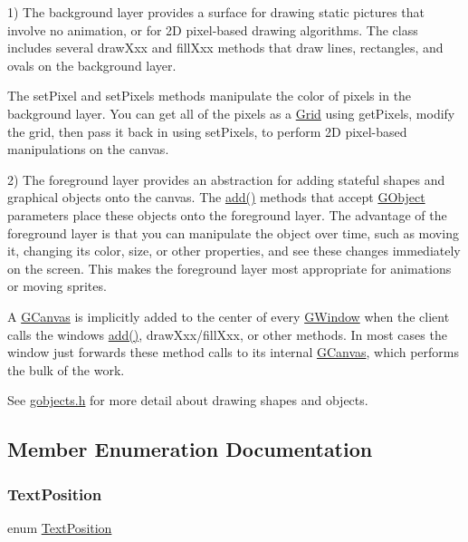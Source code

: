 1) The background layer provides a surface for drawing static pictures that involve no animation, or for 2D pixel-\/based drawing algorithms. The class includes several draw\+Xxx and fill\+Xxx methods that draw lines, rectangles, and ovals on the background layer.

The set\+Pixel and set\+Pixels methods manipulate the color of pixels in the background layer. You can get all of the pixels as a \mbox{\hyperlink{classGrid}{Grid}} using get\+Pixels, modify the grid, then pass it back in using set\+Pixels, to perform 2D pixel-\/based manipulations on the canvas.

2) The foreground layer provides an abstraction for adding stateful shapes and graphical objects onto the canvas. The \mbox{\hyperlink{classGCanvas_afe8277e7b2627513c6f7452fb0b2847d}{add()}} methods that accept \mbox{\hyperlink{classGObject}{G\+Object}} parameters place these objects onto the foreground layer. The advantage of the foreground layer is that you can manipulate the object over time, such as moving it, changing its color, size, or other properties, and see these changes immediately on the screen. This makes the foreground layer most appropriate for animations or moving sprites.

A \mbox{\hyperlink{classGCanvas}{G\+Canvas}} is implicitly added to the center of every \mbox{\hyperlink{classGWindow}{G\+Window}} when the client calls the window\textquotesingle{}s \mbox{\hyperlink{classGCanvas_afe8277e7b2627513c6f7452fb0b2847d}{add()}}, draw\+Xxx/fill\+Xxx, or other methods. In most cases the window just forwards these method calls to its internal \mbox{\hyperlink{classGCanvas}{G\+Canvas}}, which performs the bulk of the work.

See \mbox{\hyperlink{gobjects_8h_source}{gobjects.\+h}} for more detail about drawing shapes and objects. 

\subsection{Member Enumeration Documentation}
\mbox{\label{classGInteractor_a8e0d441725a81d2bbdebbea09078260e}} 
\subsubsection{\texorpdfstring{Text\+Position}{TextPosition}}
{\footnotesize\ttfamily enum \mbox{\hyperlink{classGInteractor_a8e0d441725a81d2bbdebbea09078260e}{Text\+Position}}\hspace{0.3cm}{\ttfamily [inherited]}}



